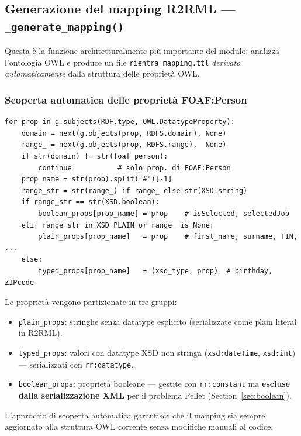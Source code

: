 \documentclass[a4paper,12pt]{article}
\begin{document}
\subsection{Generazione del mapping R2RML --- \texttt{\_generate\_mapping()}}

Questa \`{e} la funzione architetturalmente pi\`{u} importante del modulo:
analizza l'ontologia OWL e produce un file \texttt{rientra\_mapping.ttl}
\textit{derivato automaticamente} dalla struttura delle propriet\`{a} OWL.

\subsubsection{Scoperta automatica delle propriet\`{a} FOAF:Person}

\begin{lstlisting}[caption={Classificazione automatica delle datatype properties.}]
for prop in g.subjects(RDF.type, OWL.DatatypeProperty):
    domain = next(g.objects(prop, RDFS.domain), None)
    range_ = next(g.objects(prop, RDFS.range),  None)
    if str(domain) != str(foaf_person):
        continue           # solo prop. di FOAF:Person
    prop_name = str(prop).split("#")[-1]
    range_str = str(range_) if range_ else str(XSD.string)
    if range_str == str(XSD.boolean):
        boolean_props[prop_name] = prop    # isSelected, selectedJob
    elif range_str in XSD_PLAIN or range_ is None:
        plain_props[prop_name]   = prop    # first_name, surname, TIN, ...
    else:
        typed_props[prop_name]   = (xsd_type, prop)  # birthday, ZIPcode
\end{lstlisting}

\noindent Le propriet\`{a} vengono partizionate in tre gruppi:
\begin{itemize}[noitemsep]
  \item \texttt{plain\_props}: stringhe senza datatype esplicito
        (serializzate come plain literal in R2RML).
  \item \texttt{typed\_props}: valori con datatype XSD non stringa
        (\texttt{xsd:dateTime}, \texttt{xsd:int}) --- serializzati con
        \texttt{rr:datatype}.
  \item \texttt{boolean\_props}: propriet\`{a} booleane --- gestite con
        \texttt{rr:constant} ma \textbf{escluse dalla serializzazione XML}
        per il problema Pellet (Section~\ref{sec:boolean}).
\end{itemize}

L'approccio di scoperta automatica garantisce che il mapping sia sempre
aggiornato alla struttura OWL corrente senza modifiche manuali al codice.
\end{document}
